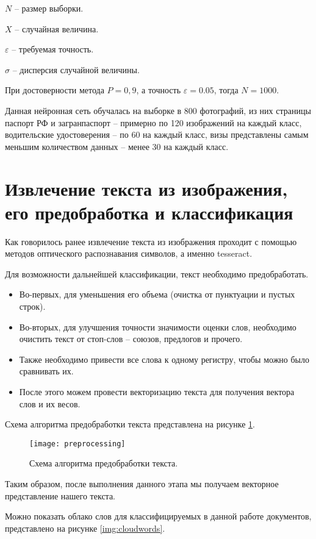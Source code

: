 $N$ -- размер выборки.

$X$ -- случайная величина.

$\varepsilon$ -- требуемая точность.

$\sigma$ -- дисперсия случайной величины.

При достоверности метода $P= 0,9$, а точность $\varepsilon=0.05$, тогда $N=1000$.

Данная нейронная сеть обучалась на выборке в 800 фотографий, из них страницы паспорт РФ и загранпаспорт -- примерно по 120 изображений на каждый класс, водительские удостоверения -- по 60 на каждый класс, визы представлены самым меньшим количеством данных -- менее 30 на каждый класс.

\section{Извлечение текста из изображения, его предобработка и классификация}

Как говорилось ранее извлечение текста из изображения проходит с помощью методов оптического распознавания символов, а именно tesseract.

Для возможности дальнейшей классификации, текст необходимо предобработать.

\begin{itemize}
\item Во-первых, для уменьшения его объема (очистка от пунктуации и пустых строк).
\item Во-вторых, для улучшения точности значимости оценки слов, необходимо очистить текст от стоп-слов -- союзов, предлогов и прочего.
\item Также необходимо привести все слова к одному регистру, чтобы можно было сравнивать их.
\item После этого можем провести векторизацию текста для получения вектора слов и их весов.
\end{itemize}

Схема алгоритма предобработки текста представлена на рисунке \ref{img:preprocessing}.

\begin{figure}[H]
	\centering
	\texttt{[image: preprocessing]}
	\caption{Схема алгоритма предобработки текста. }
	\label{img:preprocessing}
\end{figure}

Таким образом, после выполнения данного этапа мы получаем векторное представление нашего текста.

Можно показать облако слов для классифицируемых в данной работе документов, представлено на рисунке \ref{img:cloudwords}. 

